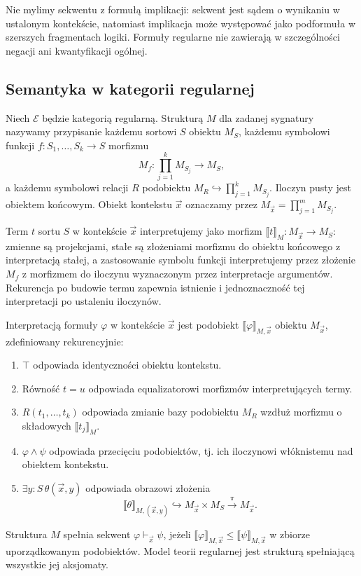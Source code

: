 Nie mylimy sekwentu z formułą implikacji: sekwent jest sądem o wynikaniu w ustalonym kontekście, natomiast implikacja może występować jako podformuła w szerszych fragmentach logiki. Formuły regularne nie zawierają w szczególności negacji ani kwantyfikacji ogólnej.

\subsection{Semantyka w kategorii regularnej}

\begin{definicja}\label{cat:def:cl-structure}
Niech $\mathcal E$ będzie kategorią regularną. Strukturą $M$ dla zadanej sygnatury nazywamy przypisanie każdemu sortowi $S$ obiektu $M_S$, każdemu symbolowi funkcji $f:S_1,\ldots,S_k\to S$ morfizmu
\[
 M_f:\prod_{j=1}^k M_{S_j}\longrightarrow M_S,
\]
a każdemu symbolowi relacji $R$ podobiektu $M_R\hookrightarrow\prod_{j=1}^k M_{S_j}$. Iloczyn pusty jest obiektem końcowym. Obiekt kontekstu $\vec x$ oznaczamy przez $M_{\vec x}=\prod_{j=1}^m M_{S_j}$.
\end{definicja}

Term $t$ sortu $S$ w kontekście $\vec x$ interpretujemy jako morfizm $\llbracket t\rrbracket_M:M_{\vec x}\to M_S$: zmienne są projekcjami, stałe są złożeniami morfizmu do obiektu końcowego z interpretacją stałej, a zastosowanie symbolu funkcji interpretujemy przez złożenie $M_f$ z morfizmem do iloczynu wyznaczonym przez interpretacje argumentów. Rekurencja po budowie termu zapewnia istnienie i jednoznaczność tej interpretacji po ustaleniu iloczynów.

\begin{definicja}\label{cat:def:cl-regular-semantics}
Interpretacją formuły $\varphi$ w kontekście $\vec x$ jest podobiekt $\llbracket\varphi\rrbracket_{M,\vec x}$ obiektu $M_{\vec x}$, zdefiniowany rekurencyjnie:
\begin{enumerate}
 \item $\top$ odpowiada identyczności obiektu kontekstu.
 \item Równość $t=u$ odpowiada equalizatorowi morfizmów interpretujących termy.
 \item $R(t_1,\ldots,t_k)$ odpowiada zmianie bazy podobiektu $M_R$ wzdłuż morfizmu o składowych $\llbracket t_j\rrbracket_M$.
 \item $\varphi\wedge\psi$ odpowiada przecięciu podobiektów, tj. ich iloczynowi włóknistemu nad obiektem kontekstu.
 \item $\exists y:S\,\theta(\vec x,y)$ odpowiada obrazowi złożenia
 \[
 \llbracket\theta\rrbracket_{M,(\vec x,y)}
 \hookrightarrow M_{\vec x}\times M_S
 \xrightarrow{\pi} M_{\vec x}.
 \]
\end{enumerate}
Struktura $M$ spełnia sekwent $\varphi\vdash_{\vec x}\psi$, jeżeli $\llbracket\varphi\rrbracket_{M,\vec x}\leq\llbracket\psi\rrbracket_{M,\vec x}$ w zbiorze uporządkowanym podobiektów. Model teorii regularnej jest strukturą spełniającą wszystkie jej aksjomaty.
\end{definicja}

